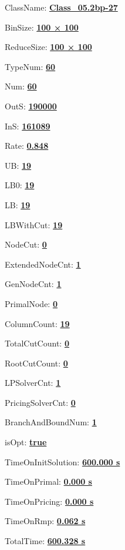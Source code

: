 \documentclass[11pt]{article}
\begin{document}
\pagestyle{empty}


ClassName: \underline{\textbf{Class_05.2bp-27}}
\par
BinSize: \underline{\textbf{100 × 100}}
\par
ReduceSize: \underline{\textbf{100 × 100}}
\par
TypeNum: \underline{\textbf{60}}
\par
Num: \underline{\textbf{60}}
\par
OutS: \underline{\textbf{190000}}
\par
InS: \underline{\textbf{161089}}
\par
Rate: \underline{\textbf{0.848}}
\par
UB: \underline{\textbf{19}}
\par
LB0: \underline{\textbf{19}}
\par
LB: \underline{\textbf{19}}
\par
LBWithCut: \underline{\textbf{19}}
\par
NodeCut: \underline{\textbf{0}}
\par
ExtendedNodeCnt: \underline{\textbf{1}}
\par
GenNodeCnt: \underline{\textbf{1}}
\par
PrimalNode: \underline{\textbf{0}}
\par
ColumnCount: \underline{\textbf{19}}
\par
TotalCutCount: \underline{\textbf{0}}
\par
RootCutCount: \underline{\textbf{0}}
\par
LPSolverCnt: \underline{\textbf{1}}
\par
PricingSolverCnt: \underline{\textbf{0}}
\par
BranchAndBoundNum: \underline{\textbf{1}}
\par
isOpt: \underline{\textbf{true}}
\par
TimeOnInitSolution: \underline{\textbf{600.000 s}}
\par
TimeOnPrimal: \underline{\textbf{0.000 s}}
\par
TimeOnPricing: \underline{\textbf{0.000 s}}
\par
TimeOnRmp: \underline{\textbf{0.062 s}}
\par
TotalTime: \underline{\textbf{600.328 s}}
\par
\newpage


\end{document}
